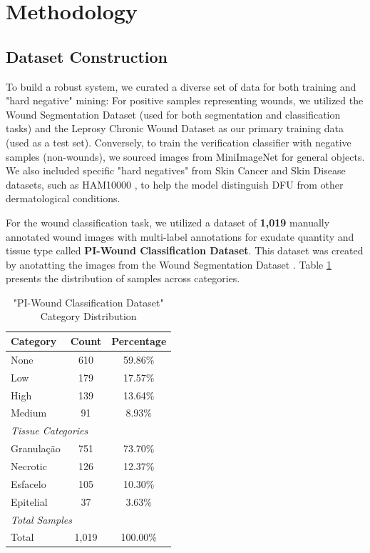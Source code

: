 \documentclass{article}
\begin{document}
\section{Methodology}

\subsection{Dataset Construction}
To build a robust system, we curated a diverse set of data for both training and "hard negative" mining:
For positive samples representing wounds, we utilized the Wound Segmentation Dataset \cite{wang2020wound} (used for both segmentation and classification tasks) and the Leprosy Chronic Wound Dataset as our primary training data (used as a test set). Conversely, to train the verification classifier with negative samples (non-wounds), we sourced images from MiniImageNet for general objects. We also included specific "hard negatives" from Skin Cancer and Skin Disease datasets, such as HAM10000 \cite{tschandl2018ham10000}, to help the model distinguish DFU from other dermatological conditions.

For the wound classification task, we utilized a dataset of \textbf{1,019} manually annotated wound images with multi-label annotations for exudate quantity and tissue type called \textbf{PI-Wound Classification Dataset}. This dataset was created by anotatting the images from the Wound Segmentation Dataset \cite{wang2020wound}. Table \ref{tab:dataset_distribution} presents the distribution of samples across categories.
\begin{table}[h]
  \caption{"PI-Wound Classification Dataset" Category Distribution}
  \centering
  \begin{tabular}{lcc}
    \toprule
    Category & Count & Percentage \\\midrule
    None & 610 & 59.86\% \\
    Low & 179 & 17.57\% \\
    High & 139 & 13.64\% \\
    Medium & 91 & 8.93\% \\
    \midrule
    \multicolumn{3}{l}{\textit{Tissue Categories}} \\
    \midrule
    Granulação & 751 & 73.70\% \\
    Necrotic & 126 & 12.37\% \\
    Esfacelo & 105 & 10.30\% \\
    Epitelial & 37 & 3.63\% \\
    \midrule
    \multicolumn{3}{l}{\textit{Total Samples}} \\
    \midrule
    Total & 1,019 & 100.00\% \\
    \bottomrule
  \end{tabular}
  \label{tab:dataset_distribution}
\end{table}
\end{document}
